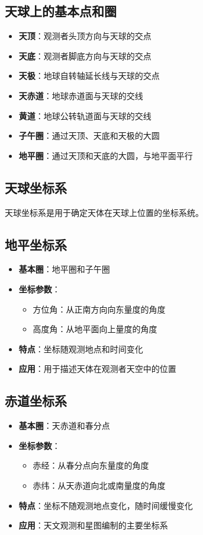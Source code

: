\documentclass[12pt,UTF8]{ctexbook}
\begin{document}
\subsection{天球上的基本点和圈}

\begin{itemize}
  \item \textbf{天顶}：观测者头顶方向与天球的交点
  \item \textbf{天底}：观测者脚底方向与天球的交点
  \item \textbf{天极}：地球自转轴延长线与天球的交点
  \item \textbf{天赤道}：地球赤道面与天球的交线
  \item \textbf{黄道}：地球公转轨道面与天球的交线
  \item \textbf{子午圈}：通过天顶、天底和天极的大圆
  \item \textbf{地平圈}：通过天顶和天底的大圆，与地平面平行
\end{itemize}

\subsection{天球坐标系}

天球坐标系是用于确定天体在天球上位置的坐标系统。

\subsection{地平坐标系}

\begin{itemize}
  \item \textbf{基本圈}：地平圈和子午圈
  \item \textbf{坐标参数}：
    \begin{itemize}
      \item 方位角：从正南方向向东量度的角度
      \item 高度角：从地平面向上量度的角度
    \end{itemize}
  \item \textbf{特点}：坐标随观测地点和时间变化
  \item \textbf{应用}：用于描述天体在观测者天空中的位置
\end{itemize}

\subsection{赤道坐标系}

\begin{itemize}
  \item \textbf{基本圈}：天赤道和春分点
  \item \textbf{坐标参数}：
    \begin{itemize}
      \item 赤经：从春分点向东量度的角度
      \item 赤纬：从天赤道向北或南量度的角度
    \end{itemize}
  \item \textbf{特点}：坐标不随观测地点变化，随时间缓慢变化
  \item \textbf{应用}：天文观测和星图编制的主要坐标系
\end{itemize}
\end{document}
